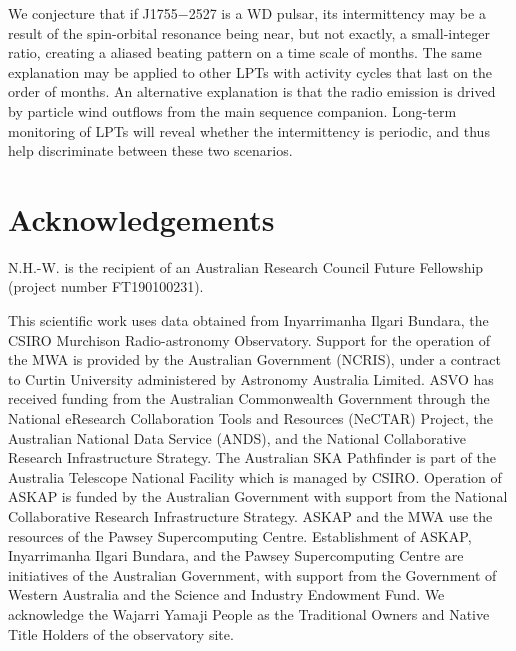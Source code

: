 \documentclass[fleqn,usenatbib]{mnras}
\newcommand{\src}{J1755$-$2527}
\begin{document}
We conjecture that if \src{} is a WD pulsar, its intermittency may be a result of the spin-orbital resonance being near, but not exactly, a small-integer ratio, creating a aliased beating pattern on a time scale of months.
The same explanation may be applied to other LPTs with activity cycles that last on the order of months.
An alternative explanation is that the radio emission is drived by particle wind outflows from the main sequence companion.
Long-term monitoring of LPTs will reveal whether the intermittency is periodic, and thus help discriminate between these two scenarios.

\section*{Acknowledgements}

N.H.-W. is the recipient of an Australian Research Council Future Fellowship (project number FT190100231).
 
 This scientific work uses data obtained from Inyarrimanha Ilgari Bundara, the CSIRO Murchison Radio-astronomy Observatory. Support for the operation of the MWA is provided by the Australian Government (NCRIS), under a contract to Curtin University administered by Astronomy Australia Limited. ASVO has received funding from the Australian Commonwealth Government through the National eResearch Collaboration Tools and Resources (NeCTAR) Project, the Australian National Data Service (ANDS), and the National Collaborative Research Infrastructure Strategy.
The Australian SKA Pathfinder is part of the Australia Telescope National Facility which is managed by CSIRO. Operation of ASKAP is funded by the Australian Government with support from the National Collaborative Research Infrastructure Strategy. ASKAP and the MWA use the resources of the Pawsey Supercomputing Centre. Establishment of ASKAP, Inyarrimanha Ilgari Bundara, and the Pawsey Supercomputing Centre are initiatives of the Australian Government, with support from the Government of Western Australia and the Science and Industry Endowment Fund. We acknowledge the Wajarri Yamaji People as the Traditional Owners and Native Title Holders of the observatory site.
\end{document}

